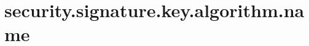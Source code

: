 \section{security.signature.key.algorithm.name}
\label{configuration:SecuritySignatureKeyAlgorithmName}
\AvailableInJavaOnly{\TODO}